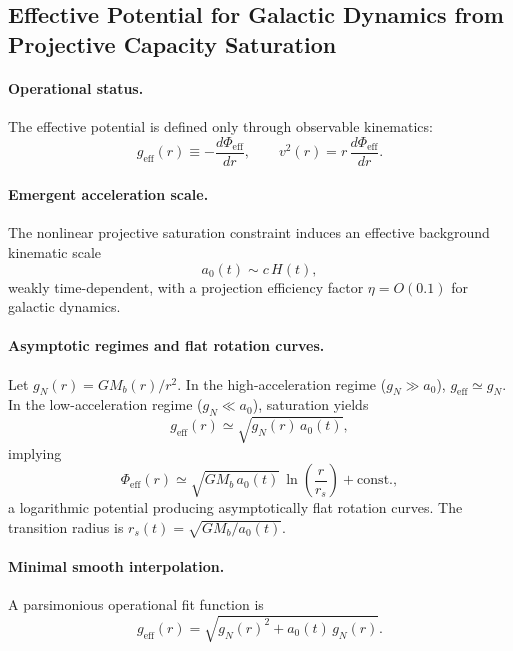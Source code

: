 \subsection{Effective Potential for Galactic Dynamics from Projective Capacity Saturation}
  \label{subsec:phi-eff-galaxies}

  \paragraph{Operational status.}
    The effective potential is defined only through observable kinematics:
    \begin{equation}
      g_{\mathrm{eff}}(r) \equiv -\frac{d\Phi_{\mathrm{eff}}}{dr},
      \qquad
      v^2(r) = r\,\frac{d\Phi_{\mathrm{eff}}}{dr}.
    \end{equation}

  \paragraph{Emergent acceleration scale.}
    The nonlinear projective saturation constraint induces an effective
    background kinematic scale
    \begin{equation}
      a_0(t) \sim c\,H(t),
    \end{equation}
    weakly time-dependent, with a projection efficiency factor
    $\eta = O(0.1)$ for galactic dynamics.

  \paragraph{Asymptotic regimes and flat rotation curves.}
    Let $g_N(r) = GM_b(r)/r^2$.
    In the high-acceleration regime ($g_N \gg a_0$), $g_{\mathrm{eff}} \simeq g_N$.
    In the low-acceleration regime ($g_N \ll a_0$), saturation yields
    \begin{equation}
      g_{\mathrm{eff}}(r)
      \simeq \sqrt{g_N(r)\,a_0(t)},
    \end{equation}
    implying
    \begin{equation}
      \Phi_{\mathrm{eff}}(r)
      \simeq \sqrt{G M_b\,a_0(t)}\,
      \ln\!\left(\frac{r}{r_s}\right) + \mathrm{const.},
      \label{eq:phi-log}
    \end{equation}
    a logarithmic potential producing asymptotically flat rotation curves.
    The transition radius is
    $r_s(t) = \sqrt{G M_b / a_0(t)}$.

  \paragraph{Minimal smooth interpolation.}
    A parsimonious operational fit function is
    \begin{equation}
      g_{\mathrm{eff}}(r)
      = \sqrt{g_N(r)^2 + a_0(t)\,g_N(r)}.
      \label{eq:geff-interp}
    \end{equation}

